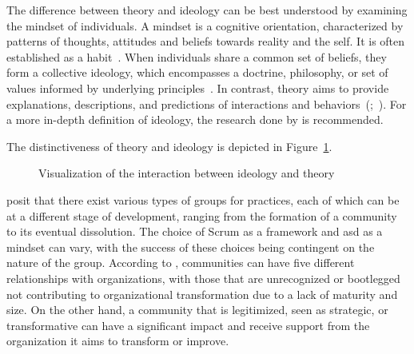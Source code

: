 The difference between theory and \gls{ideology} can be best understood by examining the \gls{mindset} of individuals. A \gls{mindset} is a cognitive orientation, characterized by patterns of thoughts, attitudes and beliefs towards reality and the self. It is often established as a habit~\cite{Dictionary2022ME, 2018IvM}. When individuals share a common set of beliefs, they form a collective ideology, which encompasses a doctrine, philosophy, or set of values informed by underlying \glspl{principle}~\cite{Dictionary2022IE, 2018IvM}. In contrast, theory aims to provide explanations, descriptions, and predictions of interactions and behaviors~(;~). For a more in-depth definition of ideology, the research done by  is recommended.

The distinctiveness of theory and \gls{ideology} is depicted in Figure~\ref{fig:theory-ideology}.

\newpage
\begin{figure}[!h]
	\begin{center}
        \caption{Visualization of the interaction between ideology and theory}\label{fig:theory-ideology}
    \end{center}
\end{figure}

 posit that there exist various types of groups for practices, each of which can be at a different stage of development, ranging from the formation of a community to its eventual dissolution. The choice of Scrum as a \gls{framework} and \ac{asd} as a \gls{mindset} can vary, with the success of these choices being contingent on the nature of the group. According to , communities can have five different relationships with organizations, with those that are unrecognized or bootlegged not contributing to organizational \gls{transformation} due to a lack of maturity and size. On the other hand, a community that is legitimized, seen as strategic, or transformative can have a significant impact and receive support from the organization it aims to transform or improve.

